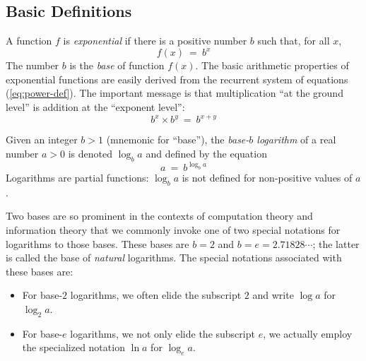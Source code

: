 \subsection{Basic Definitions}
\label{sec:exponential-function}

 

A function $f$ is {\it exponential} if there is a positive number $b$ such that, for all $x$,
\begin{equation}
\label{eq:exponential-defn}
f(x) \ = \ b^x
\end{equation}
The number $b$ is the {\it base} of function $f(x)$.  The basic arithmetic properties of exponential functions are easily derived from the recurrent system of equations (\ref{eq:power-def}).  The important message is that multiplication ``at the ground level'' is addition at the ``exponent level'':
\[ b^x \times b^y \ = \ b^{x+y} \]

  

Given an integer $b >1$ (mnemonic for ``base''), the {\em base-$b$ logarithm} of a real number $a > 0$ is denoted $\log_b a$ and defined by the equation
\begin{equation}
\label{eq:logarithm-defn}
a \ = \ b^{\log_b a}
\end{equation}
Logarithms are partial functions: $\log_b a$ is not defined for non-positive values of $a$.

\smallskip


Two bases are so prominent in the contexts of computation theory and information theory that we commonly invoke one of two special notations for logarithms to those bases.  These bases are $b = 2$ and $b = e = 2.71828 \cdots$; the latter is called the base of {\em natural} logarithms.  The special notations associated with these bases are: 
\begin{itemize}
\item
For base-$2$ logarithms, we often elide the subscript $2$ and write $\log a$ for $\log_2 a$.
\medskip\item
For base-$e$ logarithms, we not only  elide the subscript $e$, we actually employ the specialized notation $\ln a$ for $\log_e a$.
\end{itemize}

